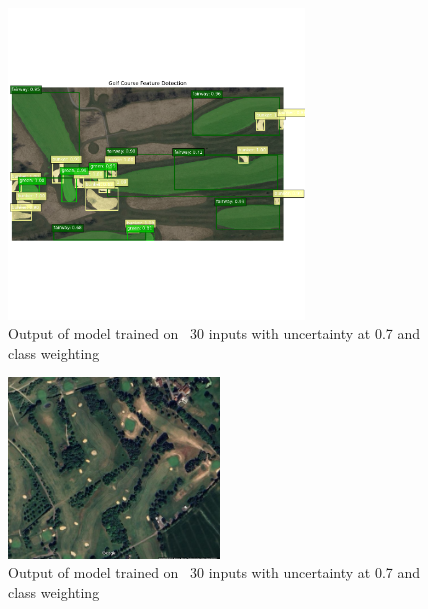 \documentclass[final]{cmpreport_02}
\begin{document}
\begin{figure}[h!]
	\centering
	\includegraphics[width=0.7\textwidth]{./images/AENoRoughDemoTraining.png}
	\caption{Output of model trained on ~30 inputs with uncertainty at 0.7 and class weighting}
	\label{am:AENoRoughDemoTraining}
\end{figure}


\begin{figure}[h!]
	\centering
	\includegraphics[width=0.5\textwidth]{./images/AEEnglishCoursePlain.png}
	\caption{Output of model trained on ~30 inputs with uncertainty at 0.7 and class weighting}
	\label{am:AEEnglishCoursePlain}
\end{figure}
\end{document}
